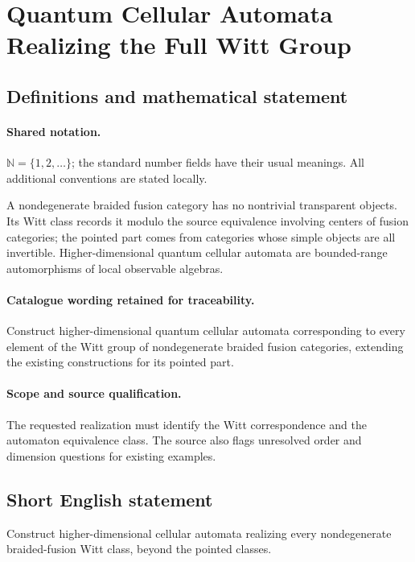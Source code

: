 \documentclass[11pt]{article}
\begin{document}
\section{Quantum Cellular Automata Realizing the Full Witt Group}\label{statement}

\subsection{Definitions and mathematical statement}

\paragraph{Shared notation.}$\mathbb N=\{1,2,\ldots\}$; the standard number fields have their usual meanings. All additional conventions are stated locally.


A nondegenerate braided fusion category has no nontrivial transparent objects. Its Witt class records it modulo the source equivalence involving centers of fusion categories; the pointed part comes from categories whose simple objects are all invertible. Higher-dimensional quantum cellular automata are bounded-range automorphisms of local observable algebras.

\paragraph{Catalogue wording retained for traceability.}
Construct higher-dimensional quantum cellular automata corresponding to every element of the Witt group of nondegenerate braided fusion categories, extending the existing constructions for its pointed part.

\paragraph{Scope and source qualification.}The requested realization must identify the Witt correspondence and the automaton equivalence class. The source also flags unresolved order and dimension questions for existing examples.
\subsection{Short English statement}
Construct higher-dimensional cellular automata realizing every nondegenerate braided-fusion Witt class, beyond the pointed classes.
\end{document}
